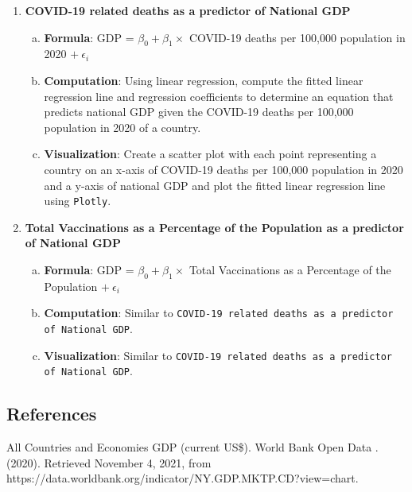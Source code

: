 \documentclass[fontsize=11pt]{article}
\begin{document}
\begin{enumerate}
        \newpage

        \item \textbf{COVID-19 related deaths as a predictor of National GDP}
            \begin{enumerate}[(a)]
                \item \textbf{Formula}: GDP = $\beta_{0} + \beta_{1} \times$ COVID-19 deaths per 100,000 population in 2020 $+ \  \epsilon_{i}$
                \item \textbf{Computation}: Using linear regression, compute the fitted linear regression line and regression coefficients to determine an equation that predicts national GDP given the COVID-19 deaths per 100,000 population in 2020 of a country.
                \item \textbf{Visualization}: Create a scatter plot with each point representing a country on an x-axis of COVID-19 deaths per 100,000 population in 2020 and a y-axis of national GDP and plot the fitted linear regression line using \texttt{Plotly}.
            \end{enumerate}
        \item \textbf{Total Vaccinations as a Percentage of the Population as a predictor of National GDP}
            \begin{enumerate}[(a)]
                \item \textbf{Formula}: GDP = $\beta_{0} + \beta_{1} \times$ Total Vaccinations as a Percentage of the Population $+ \ \epsilon_{i}$
                \item \textbf{Computation}: Similar to \texttt{COVID-19 related deaths as a predictor of National GDP}.
                \item \textbf{Visualization}: Similar to \texttt{COVID-19 related deaths as a predictor of National GDP}.
            \end{enumerate}
    \end{enumerate}

\newpage
\begin{center}
\section*{References}
\end{center}

    \item All Countries and Economies GDP (current US\$). World Bank Open Data . (2020). Retrieved November 4, 2021, \indent from https://data.worldbank.org/indicator/NY.GDP.MKTP.CD?view=chart.  \\
\end{document}
